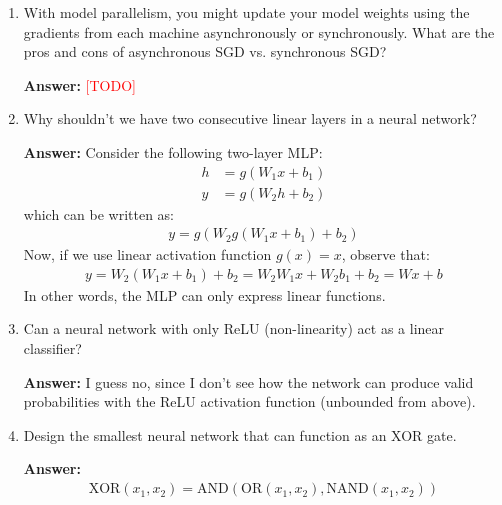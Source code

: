 \documentclass{article}
\newenvironment{QandA}{\begin{enumerate}[label=\arabic*.]}{\end{enumerate}}
\newenvironment{answer}{\par\normalfont \textbf{Answer:}}{}
\newcommand{\todo}{\textcolor{red}{[TODO]}}
\begin{document}
\begin{QandA}
    \item With model parallelism, you might update your model weights using the gradients from each machine asynchronously or synchronously. What are the pros and cons of asynchronous SGD vs. synchronous SGD?
    \begin{answer}
        \todo 
    \end{answer}

    \item Why shouldn’t we have two consecutive linear layers in a neural network?
    \begin{answer}
        Consider the following two-layer MLP:
        \begin{align*}
            h &= g(W_1 x + b_1) \\
            y &= g(W_2 h + b_2)
        \end{align*}
        which can be written as:
        \begin{align*}
            y = g(W_2 g(W_1 x + b_1) + b_2)
        \end{align*}
        Now, if we use linear activation function $g(x) = x$, observe that:
        \begin{align*}
            y = W_2 (W_1 x + b_1) + b_2 = W_2 W_1 x + W_2 b_1 + b_2 = W x + b
        \end{align*}
        In other words, the MLP can only express linear functions. 
    \end{answer}

    \item Can a neural network with only ReLU (non-linearity) act as a linear classifier?
    \begin{answer}
        I guess no, since I don't see how the network can produce valid probabilities with the ReLU activation function (unbounded from above). 
    \end{answer}

    \item Design the smallest neural network that can function as an XOR gate.
    \begin{answer}
        \begin{align*}
            \text{XOR}(x_1, x_2) = \text{AND} \left( \text{OR}(x_1, x_2), \text{NAND}(x_1, x_2) \right)
        \end{align*}
    \end{answer}


\end{QandA}
\end{document}
